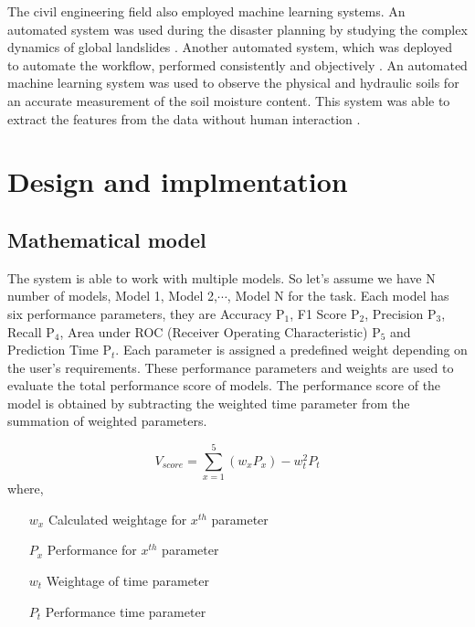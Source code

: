 \documentclass[a4paper,fleqn]{cas-dc}
\begin{document}
The civil engineering field also employed machine learning systems. An automated system was used during the disaster planning by studying the complex dynamics of global landslides \cite{ref_paper_a_10}. Another automated system, which was deployed to automate the workflow, performed consistently and objectively \cite{ref_paper_a_13}. An automated machine learning system was used to observe the physical and hydraulic soils for an accurate measurement of the soil moisture content. This system was able to extract the features from the data without human interaction \cite{ref_paper_a_8}.

\section{Design and implmentation}\label{sec:design_and_implmentation}

\subsection{Mathematical model}\label{subsec:mathematical_model}

The system is able to work with multiple models. So let's assume we have N number of models, Model 1, Model 2,$\cdots$, Model N for the task. Each model has six performance parameters, they are Accuracy P$_1$, F1 Score P$_2$, Precision P$_3$, Recall P$_4$, Area under ROC (Receiver Operating Characteristic) P$_5$ and Prediction Time P$_t$. Each parameter is assigned a predefined weight depending on the user's requirements. These performance parameters and weights are used to evaluate the total performance score of models. The performance score of the model is obtained by subtracting the weighted time parameter from the summation of weighted parameters.

\begin{equation}\label{eq:V_score_formula}
    V_{score} = \sum_{x=1}^5 \left(w_xP_x\right) - w_t^2P_t
\end{equation}
where,
\vspace{-0.75em}
\begin{itemize}
    \setlength{\itemsep}{-0.2em}
    \item[$w_x$] Calculated weightage for $x^{th}$ parameter
    \item[$P_x$] Performance for $x^{th}$ parameter
    \item[$w_t$] Weightage of time parameter
    \item[$P_t$] Performance time parameter
\end{itemize}
\end{document}
